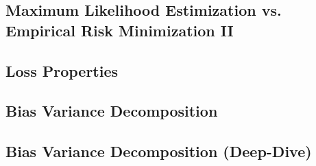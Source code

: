 \subsection{Maximum Likelihood Estimization vs. Empirical Risk Minimization II}


\subsection{Loss Properties}


\subsection{Bias Variance Decomposition}


\subsection{Bias Variance Decomposition (Deep-Dive)}

